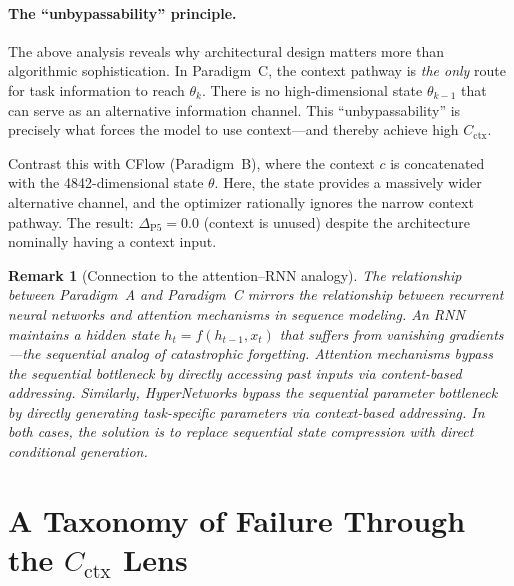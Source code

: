 \documentclass{article}
\newtheorem{remark}{Remark}
\begin{document}
\paragraph{The ``unbypassability'' principle.} The above analysis reveals why architectural design matters more than algorithmic sophistication. In Paradigm~C, the context pathway is \emph{the only} route for task information to reach $\theta_k$. There is no high-dimensional state $\theta_{k-1}$ that can serve as an alternative information channel. This ``unbypassability'' is precisely what forces the model to use context---and thereby achieve high $C_\mathrm{ctx}$.

Contrast this with CFlow (Paradigm~B), where the context $c$ is concatenated with the 4842-dimensional state $\theta$. Here, the state provides a massively wider alternative channel, and the optimizer rationally ignores the narrow context pathway. The result: $\Delta_\mathrm{P5} = 0.0$ (context is unused) despite the architecture nominally having a context input.

\begin{remark}[Connection to the attention--RNN analogy]
The relationship between Paradigm~A and Paradigm~C mirrors the relationship between recurrent neural networks and attention mechanisms in sequence modeling. An RNN maintains a hidden state $h_t = f(h_{t-1}, x_t)$ that suffers from vanishing gradients---the sequential analog of catastrophic forgetting. Attention mechanisms bypass the sequential bottleneck by directly accessing past inputs via content-based addressing. Similarly, HyperNetworks bypass the sequential parameter bottleneck by directly generating task-specific parameters via context-based addressing. In both cases, the solution is to replace \emph{sequential state compression} with \emph{direct conditional generation}.
\end{remark}



\section{A Taxonomy of Failure Through the \texorpdfstring{$C_\mathrm{ctx}$}{Cctx} Lens}
\label{sec:failure_taxonomy}
\end{document}
